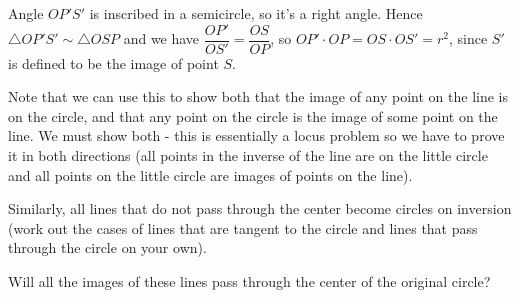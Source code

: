 




Angle $OP'S'$ is inscribed in a semicircle, so it's a right angle.  Hence $\triangle OP'S' \sim \triangle OSP$ and we have $\dfrac{OP'}{OS'} = \dfrac{OS}{OP}$, so $OP' \cdot OP = OS \cdot OS' = r^2$, since $S'$ is defined to be the image of point $S$.

Note that we can use this to show both that the image of any point on the line is on the circle, and that any point on the circle is the image of some point on the line.  We must show both - this is essentially a locus problem so we have to prove it in both directions (all points in the inverse of the line are on the little circle and all points on the little circle are images of points on the line).

Similarly, all lines that do not pass through the center become circles on inversion (work out the cases of lines that are tangent to the circle and lines that pass through the circle on your own).

Will all the images of these lines pass through the center of the original circle?








